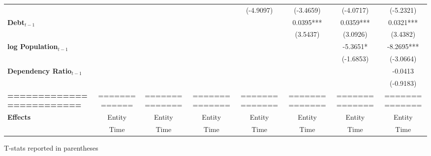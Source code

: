 \begin{center}
\begin{tabular}{lccccccc}
\textbf{ }                         &                   &                      &                           &     (-4.9097)      &    (-3.4659)    &         (-4.0717)         &          (-5.2321)            \\
\textbf{Debt$_{t-1}$}                &                   &                      &                           &                    &    0.0395***    &         0.0359***         &          0.0321***            \\
\textbf{ }                         &                   &                      &                           &                    &     (3.5437)    &          (3.0926)         &           (3.4382)            \\
\textbf{log Population$_{t-1}$}      &                   &                      &                           &                    &                 &          -5.3651*         &          -8.2695***           \\
\textbf{ }                         &                   &                      &                           &                    &                 &         (-1.6853)         &          (-3.0664)            \\
\textbf{Dependency Ratio$_{t-1}$}   &                   &                      &                           &                    &                 &                           &           -0.0413             \\
\textbf{ }                         &                   &                      &                           &                    &                 &                           &          (-0.9183)            \\
\textbf{=========================} &   =============   &    ==============    &       ==============      &   ==============   &  ============== &       ==============      &        ==============         \\
\textbf{Effects}                   &       Entity      &        Entity        &           Entity          &       Entity       &      Entity     &           Entity          &            Entity             \\
\textbf{}                          &        Time       &         Time         &            Time           &        Time        &       Time      &            Time           &             Time              \\
\bottomrule
\end{tabular}
\end{center}

T-stats reported in parentheses